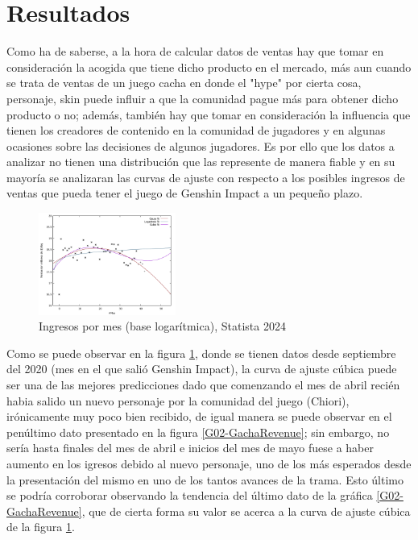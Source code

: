 \documentclass[osajnl,twocolumn,showpacs,superscriptaddress,10pt]{revtex4-2}
\begin{document}
\section{Resultados}
Como ha de saberse, a la hora de calcular datos de ventas hay que tomar en consideración la acogida que tiene dicho producto en el mercado, más aun cuando se trata de ventas de un juego cacha en donde el "hype" por cierta cosa, personaje, skin puede influir a que la comunidad pague más para obtener dicho producto o no; además, también hay que tomar en consideración la influencia que tienen los creadores de contenido en la comunidad de jugadores y en algunas ocasiones sobre las decisiones de algunos jugadores. Es por ello que los datos a analizar no tienen una distribución que las represente de manera fiable y en su mayoría se analizaran las curvas de ajuste con respecto a los posibles ingresos de ventas que pueda tener el juego de Genshin Impact a un pequeño plazo.
\begin{figure}[H]
    \begin{center}
        \includegraphics[width=0.4\textwidth]{img/GIRev01.pdf}
        \caption{\label{G01-statista}Ingresos por mes (base logarítmica), Statista 2024}
    \end{center}
\end{figure}
Como se puede observar en la figura \ref{G01-statista}, donde se tienen datos desde septiembre del 2020 (mes en el que salió Genshin Impact), la curva de ajuste cúbica puede ser una de las mejores predicciones dado que comenzando el mes de abril recién habia salido un nuevo personaje por la comunidad del juego (Chiori), irónicamente muy poco bien recibido, de igual manera se puede observar en el penúltimo dato presentado en la figura \ref{G02-GachaRevenue}; sin embargo, no sería hasta finales del mes de abril e inicios del mes de mayo fuese a haber aumento en los igresos debido al nuevo personaje, uno de los más esperados desde la presentación del mismo en uno de los tantos avances de la trama. Esto último se podría corroborar observando la tendencia del último dato de la gráfica \ref{G02-GachaRevenue}, que de cierta forma su valor se acerca a la curva de ajuste cúbica de la figura \ref{G01-statista}.
\end{document}
